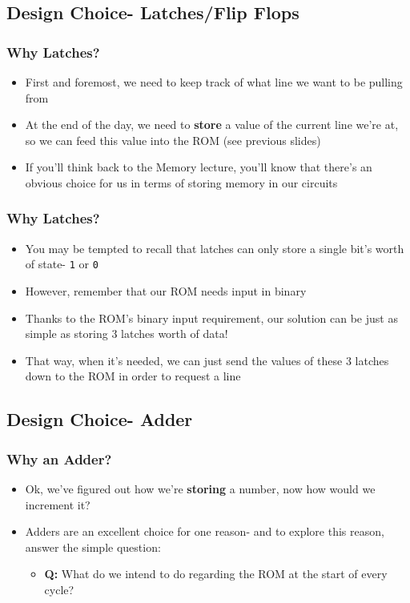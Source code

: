 \documentclass{beamer}
\begin{document}
		\subsection{Design Choice- Latches/Flip Flops}
		
		\begin{frame}
			\frametitle{Why Latches?}
			\begin{itemize}
				\item First and foremost, we need to keep track of what line we want to be pulling from
				\item At the end of the day, we need to \textbf{store} a value of the current line we're at, so we can feed this value into the ROM (see previous slides)
				\item If you'll think back to the Memory lecture, you'll know that there's an obvious choice for us in terms of storing memory in our circuits
			\end{itemize}
		\end{frame}
		
		\begin{frame}
			\frametitle{Why Latches?}
			\begin{itemize}
				\item You may be tempted to recall that latches can only store a single bit's worth of state- \texttt{1} or \texttt{0}
				\item However, remember that our ROM needs input in binary
				\item Thanks to the ROM's binary input requirement, our solution can be just as simple as storing 3 latches worth of data!
				\item That way, when it's needed, we can just send the values of these 3 latches down to the ROM in order to request a line
			\end{itemize}
		\end{frame}
		
		\subsection{Design Choice- Adder}
		
		\begin{frame}
			\frametitle{Why an Adder?}
			\begin{itemize}
				\item Ok, we've figured out how we're \textbf{storing} a number, now how would we increment it?
				\item Adders are an excellent choice for one reason- and to explore this reason, answer the simple question:
				\begin{itemize}
					\item \textbf{Q:} What do we intend to do regarding the ROM at the start of every cycle?
				\end{itemize}
			\end{itemize}
		\end{frame}
       
\end{document}
